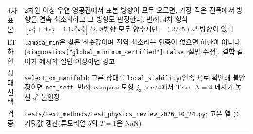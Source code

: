 \begin{tabularx}{\textwidth}{@{}P{3.0cm}Y@{}}
    4차 표본 & 2차원 이상 우연 영공간에서 표본 방향이 모두 오르면, 가장 작은 진폭에서 방향을 연속 최소화하고 그 방향도 판정한다. 반례: 4차 형식 $[x_1^4+4x_2^4-4.1x_1^2x_2^2]/2$, 8방향 모두 양수지만 $-(2/45)a^4$ 방향이 있다 \\
    LT 하한 & \texttt{lambda\_min}은 찾은 최솟값이며 전역 최소라는 인증이 없으면 하한이 아니다(\texttt{diagnostics["global\_minimum\_certified"]=False}, 설명 수정). 결합 길이가 메시의 절반 이상이면 경고 \\
    상태 선택 & \texttt{select\_on\_manifold}: 고른 상태를 \texttt{local\_stability}(연속 $k$)로 확인해 불안정이면 \texttt{not\_soft}. 반례: compass 모형 $j_3>a/4$에서 Tetra $N=4$ 메시가 놓친 $q^2$ 불안정 \\
    검증 & \texttt{tests/test\_methods/test\_physics\_review\_2026\_10\_24.py}; 고온 열 홀 기댓값 갱신(튜토리얼 5의 $T=1$은 NaN) \\
    \bottomrule
  \end{tabularx}
\endgroup

